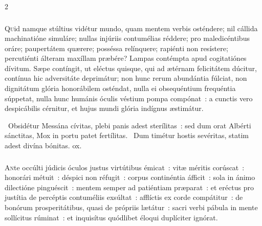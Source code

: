 \documentclass[9pt,twoside]{extarticle}
\begin{document}
\begin{multicols}{2}
\subsubsection*{\center {}}
\lettrine{Q}uid namque stúltius vidétur mundo, quam mentem verbis osténdere; nil cállida machinatióne simuláre; nullas injúriis contumélias réddere; pro maledicéntibus oráre; paupertátem quærere; posséssa relínquere; rapiénti non resístere; percutiénti álteram maxíllam præbére? Lampas contémpta apud cogitatiónes dívitum. Sæpe contíngit, ut eléctus quisque, qui ad ætérnam felicitátem dúcitur, contínua hic adversitáte deprimátur; non hunc rerum abundántia fúlciat, non dignitátum glória honorábilem osténdat, nulla ei obsequéntium frequéntia súppetat, nulla hunc humánis óculis véstium pompa compónat~: a cunctis vero despicábilis cérnitur, et hujus mundi glória indígnus æstimátur.

\begin{tightlist}{}
\item {}~Obsidétur Messána cívitas, plebi panis adest sterílitas~: sed dum orat Albérti sánctitas, \textred{*} Mox in portu patet fertílitas.
~Dum timétur hostis sevéritas, statim adest divína bónitas. ox.
\end{tightlist}

\subsubsection*{\center {}}
\lettrine{A}nte occúlti júdicis óculos justus virtútibus émicat~: vitæ méritis corúscat~: honorári métuit~: déspici non réfugit~: corpus continéntia áfficit~: sola in ánimo dilectióne pinguéscit~: mentem semper ad patiéntiam præparat~: et eréctus pro justítia de percéptis contuméliis exsúltat~: afflíctis ex corde compátitur~: de bonórum prosperitátibus, quasi de própriis lætátur~: sacri verbi pábula in mente sollícitus rúminat~: et inquisítus quódlibet éloqui duplíciter ignórat.


\end{multicols}
\end{document}
